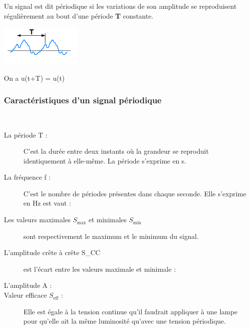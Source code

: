 \documentclass[10pt,fleqn]{article} %
\begin{document}
    \begin{defi}
        Un signal est dit périodique si les variations de son amplitude se reproduisent régulièrement au bout d'une période \textbf{T} constante.
        
        \begin{center}
            \includegraphics[width=0.3\textwidth]{images/Signal_periodique.png}
        \end{center}
        
        On a u(t+T) = u(t)
    \end{defi}
    
    \subsubsection{Caractéristiques d'un signal périodique}
    \begin{aretenir}~
    \begin{description}
        \item[La période T :] C'est la durée entre deux instants où la grandeur se reproduit identiquement à elle-même. La période s'exprime en \si{s}.
        
        \item[La fréquence f :] C'est le nombre de périodes présentes dans chaque seconde. Elle s'exprime en \si{Hz} est vaut : 
        \begin{center}
        \end{center}
        \item[Les valeurs maximales $S_{\text{max}}$ et minimales $S_{\text{min}}$] sont respectivement le maximum et le minimum du signal.
        \item[L'amplitude crête à crête S_{CC}] est l'écart entre les valeurs maximale et minimale : 
        \item[L'amplitude A :] 
        \item[Valeur efficace $S_\text{eff}$ : ] Elle est égale à la tension continue qu'il faudrait appliquer à une lampe pour qu'elle ait la même luminosité qu'avec une tension périodique.
    \end{description}
    \end{aretenir}
    
\end{document}
